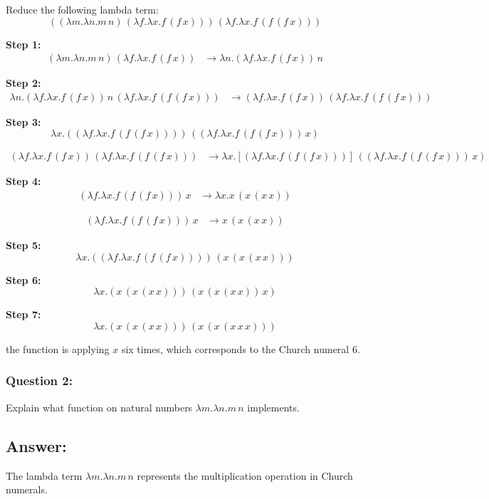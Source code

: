\documentclass{article}
\theoremstyle{theorem}
\theoremstyle{definition}
\theoremstyle{remark}
\begin{document}
Reduce the following lambda term:
\[ ((\lambda m.\lambda n.m\,n)\,(\lambda f.\lambda x.f\,(f\,x)))\,(\lambda f.\lambda x.f\,(f\,(f\,x))) \]

\textbf{Step 1:}
\begin{align*}
(\lambda m.\lambda n.m\,n)\,(\lambda f.\lambda x.f\,(f\,x)) &\rightarrow \lambda n.(\lambda f.\lambda x.f\,(f\,x))\,n
\end{align*}

\textbf{Step 2:}
\begin{align*}
\lambda n.(\lambda f.\lambda x.f\,(f\,x))\,n\,(\lambda f.\lambda x.f\,(f\,(f\,x))) &\rightarrow (\lambda f.\lambda x.f\,(f\,x))\,(\lambda f.\lambda x.f\,(f\,(f\,x)))
\end{align*}

\textbf{Step 3:} 
\[ \lambda x.((\lambda f.\lambda x.f\,(f\,(f\,x))))\,((\lambda f.\lambda x.f\,(f\,(f\,x)))\,x) \]

\begin{align*}
(\lambda f.\lambda x.f\,(f\,x))\,(\lambda f.\lambda x.f\,(f\,(f\,x))) &\rightarrow \lambda x.[(\lambda f.\lambda x.f\,(f\,(f\,x)))]\,((\lambda f.\lambda x.f\,(f\,(f\,x)))\,x)
\end{align*}

\textbf{Step 4:}
\begin{align*}
(\lambda f.\lambda x.f\,(f\,(f\,x)))\,x &\rightarrow \lambda x.x\,(x\,(x\,x))
\end{align*}

\begin{align*}
(\lambda f.\lambda x.f\,(f\,(f\,x)))\,x &\rightarrow x\,(x\,(x\,x))
\end{align*}

\textbf{Step 5:}
\[ \lambda x.((\lambda f.\lambda x.f\,(f\,(f\,x))))\,(x\,(x\,(x\,x))) \]

\textbf{Step 6:} 
\[ \lambda x.(x\,(x\,(x\,x)))\,(x\,(x\,(x\,x))\,x) \]

\textbf{Step 7:} 
\[ \lambda x.(x\,(x\,(x\,x)))\,(x\,(x\,(x\,x\,x))) \]

the function is applying $x$ six times, which corresponds to the Church numeral 6.


\subsubsection*{Question 2:}

Explain what function on natural numbers $\lambda m.\lambda n.m\,n$ implements.

\subsection*{Answer:}
The lambda term $\lambda m.\lambda n.m\,n$ represents the multiplication operation in Church numerals.
\end{document}
